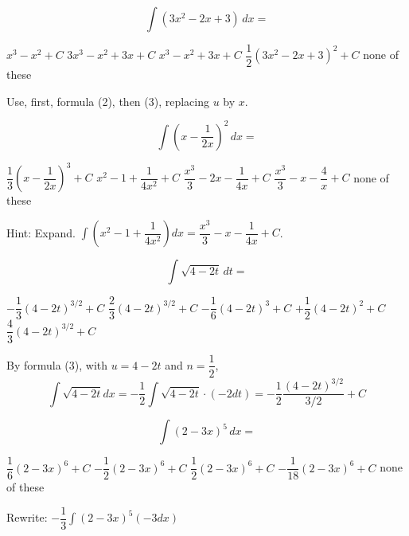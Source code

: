 %

\question
\[
\displaystyle\int\left(3 x^{2}-2 x+3\right) \,dx=
\]
\begin{choices}
  \choice $x^{3}-x^{2}+C$
  \choice $3 x^{3}-x^{2}+3 x+C$
  \CorrectChoice $x^{3}-x^{2}+3 x+C$
  \choice $\dfrac{1}{2}\left(3 x^{2}-2 x+3\right)^{2}+C$
  \choice none of these
\end{choices}
\begin{solution}
Use, first, formula (2), then (3), replacing $u$ by $x$.
\end{solution}
 
\question
\[
\displaystyle\int\left(x-\dfrac{1}{2 x}\right)^{2} \,dx=
\]
\begin{choices}
  \choice $\dfrac{1}{3}\left(x-\dfrac{1}{2 x}\right)^{3}+C$
  \choice $x^{2}-1+\dfrac{1}{4 x^{2}}+C$
  \choice $\dfrac{x^{3}}{3}-2 x-\dfrac{1}{4 x}+C$
  \choice $\dfrac{x^{3}}{3}-x-\dfrac{4}{x}+C$
  \CorrectChoice none of these
\end{choices}
\begin{solution}
Hint: Expand. $\displaystyle\int\left(x^{2}-1+\dfrac{1}{4 x^{2}}\right) d x=\dfrac{x^{3}}{3}-x-\dfrac{1}{4 x}+C$.
\end{solution}

\question
\[
\displaystyle\int \sqrt{4-2 t} \,dt=
\]
\begin{choices}
  \CorrectChoice $-\dfrac{1}{3}(4-2 t)^{3 / 2}+C$
  \choice $\dfrac{2}{3}(4-2 t)^{3 / 2}+C$
  \choice $-\dfrac{1}{6}(4-2 t)^{3}+C$
  \choice $+\dfrac{1}{2}(4-2 t)^{2}+C$
  \choice $\dfrac{4}{3}(4-2 t)^{3 / 2}+C$
\end{choices}
\begin{solution}
By formula (3), with $u=4-2 t$ and $n=\dfrac{1}{2}$,
\[
\displaystyle\int \sqrt{4-2 t} d x=-\dfrac{1}{2} \displaystyle\int \sqrt{4-2 t} \cdot(-2 d t)=-\dfrac{1}{2} \dfrac{(4-2 t)^{3 / 2}}{3 / 2}+C
\]
\end{solution}





\newpage




\question
\[
\displaystyle\int(2-3 x)^{5} \,dx=
\]
\begin{choices}
  \choice $\dfrac{1}{6}(2-3 x)^{6}+C$
  \choice $-\dfrac{1}{2}(2-3 x)^{6}+C$
  \choice $\dfrac{1}{2}(2-3 x)^{6}+C$
  \CorrectChoice $-\dfrac{1}{18}(2-3 x)^{6}+C$
  \choice none of these
\end{choices}
\begin{solution}
Rewrite: $-\dfrac{1}{3} \displaystyle\int(2-3 x)^{5}(-3 d x)$
\end{solution}

